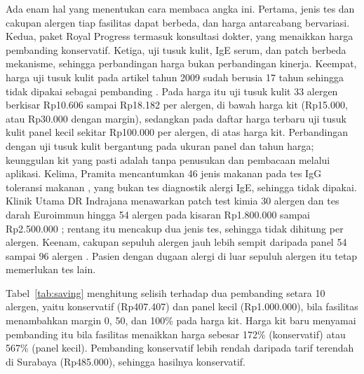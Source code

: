 \documentclass[11pt,a4paper]{article}
\begin{document}
Ada enam hal yang menentukan cara membaca angka ini. Pertama, jenis tes dan cakupan alergen tiap fasilitas dapat berbeda, dan harga antarcabang bervariasi. Kedua, paket Royal Progress termasuk konsultasi dokter, yang menaikkan harga pembanding konservatif. Ketiga, uji tusuk kulit, IgE serum, dan patch berbeda mekanisme, sehingga perbandingan harga bukan perbandingan kinerja. Keempat, harga uji tusuk kulit pada artikel tahun 2009 sudah berusia 17 tahun sehingga tidak dipakai sebagai pembanding \cite{medicastore}. Pada harga itu uji tusuk kulit 33 alergen berkisar Rp10.606 sampai Rp18.182 per alergen, di bawah harga kit (Rp15.000, atau Rp30.000 dengan margin), sedangkan pada daftar harga terbaru uji tusuk kulit panel kecil sekitar Rp100.000 per alergen, di atas harga kit. Perbandingan dengan uji tusuk kulit bergantung pada ukuran panel dan tahun harga; keunggulan kit yang pasti adalah tanpa penusukan dan pembacaan melalui aplikasi. Kelima, Pramita mencantumkan 46 jenis makanan pada tes IgG toleransi makanan \cite{pramita2}, yang bukan tes diagnostik alergi IgE, sehingga tidak dipakai. Klinik Utama DR Indrajana menawarkan patch test kimia 30 alergen dan tes darah Euroimmun hingga 54 alergen pada kisaran Rp1.800.000 sampai Rp2.500.000 \cite{tim}; rentang itu mencakup dua jenis tes, sehingga tidak dihitung per alergen. Keenam, cakupan sepuluh alergen jauh lebih sempit daripada panel 54 sampai 96 alergen \cite{royal,pramita}. Pasien dengan dugaan alergi di luar sepuluh alergen itu tetap memerlukan tes lain.

Tabel~\ref{tab:saving} menghitung selisih terhadap dua pembanding setara 10 alergen, yaitu konservatif (Rp407.407) dan panel kecil (Rp1.000.000), bila fasilitas menambahkan margin 0, 50, dan 100\% pada harga kit. Harga kit baru menyamai pembanding itu bila fasilitas menaikkan harga sebesar 172\% (konservatif) atau 567\% (panel kecil). Pembanding konservatif lebih rendah daripada tarif terendah di Surabaya (Rp485.000), sehingga hasilnya konservatif.
\end{document}
